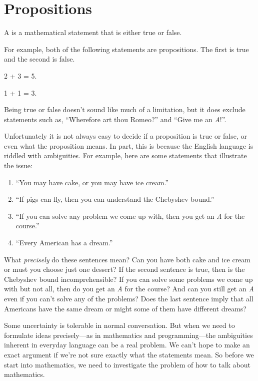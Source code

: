 \chapter{Propositions}\label{prop_chap}

\begin{definition*}
  A  is a mathematical statement that is either true or false.
\end{definition*}

For example, both of the following statements are propositions.  The
first is true and the second is false.
\begin{proposition}
2 + 3 = 5.
\end{proposition}
\begin{proposition}
1 + 1 = 3.
\end{proposition}
Being true or false doesn't sound like much of a limitation, but it
does exclude statements such as, ``Wherefore art thou Romeo?'' and
``Give me an \emph{A}!''.

Unfortunately it is not always easy to decide if a proposition is true
or false, or even what the proposition means.  In part, this is
because the English language is riddled with ambiguities.  For
example, here are some statements that illustrate the issue:
%
\begin{enumerate}
\item ``You may have cake, or you may have ice cream.''
\item ``If pigs can fly, then you can understand the Chebyshev bound.''
\item ``If you can solve any problem we come up with, then you get an
  \emph{A} for the course.''
\item ``Every American has a dream.''
\end{enumerate}
%
What \emph{precisely} do these sentences mean?  Can you have both cake
and ice cream or must you choose just one dessert?  If the second
sentence is true, then is the Chebyshev bound incomprehensible?  If
you can solve some problems we come up with but not all, then do you
get an \emph{A} for the course?  And can you still get an \emph{A}
even if you can't solve any of the problems?  Does the last sentence
imply that all Americans have the same dream or might some of them
have different dreams?

Some uncertainty is tolerable in normal conversation.  But when we need to
formulate ideas precisely---as in mathematics and programming---the
ambiguities inherent in everyday language can be a real problem.  We can't
hope to make an exact argument if we're not sure exactly what the
statements mean.  So before we start into mathematics, we need to
investigate the problem of how to talk about mathematics.

